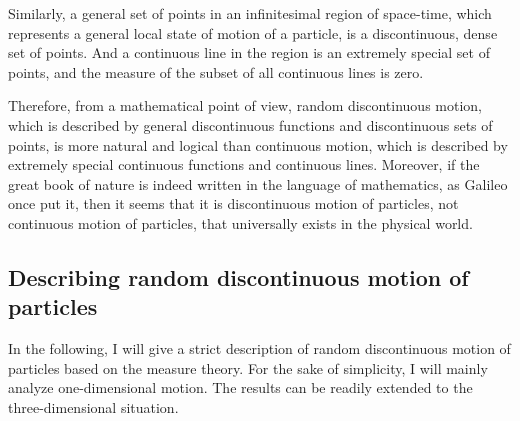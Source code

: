 \noindent Similarly, a general set of points in an infinitesimal region of space-time, which represents a general local state of motion of a particle, is a discontinuous, dense set of points. And a continuous line in the region is an extremely special set of points, and the measure of the subset of all continuous lines is zero.

Therefore, from a mathematical point of view, random discontinuous motion, which is described by general discontinuous functions and discontinuous sets of points, is more natural and logical than continuous motion, which is described by extremely special continuous functions and continuous lines.
Moreover, if the great book of nature is indeed written in the language of mathematics, as Galileo once put it, then it seems that it is discontinuous motion of particles, not continuous motion of particles, that universally exists in the physical world.



\subsection{Describing random discontinuous motion of particles}

In the following, I will give a strict description of random discontinuous motion of particles based on the measure theory. For the sake of simplicity, I will mainly analyze one-dimensional motion. The results can be readily extended to the three-dimensional situation.

